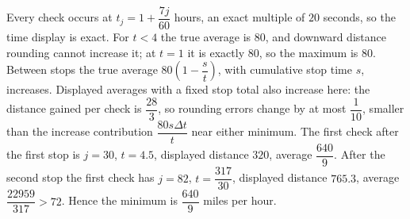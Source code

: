 Every check occurs at $t_j=1+\dfrac{7j}{60}$ hours, an exact multiple of $20$ seconds, so the time display is exact. For $t<4$ the true average is $80$, and downward distance rounding cannot increase it; at $t=1$ it is exactly $80$, so the maximum is $\boxed{80}$. Between stops the true average $80(1-\dfrac{s}{t})$, with cumulative stop time $s$, increases. Displayed averages with a fixed stop total also increase here: the distance gained per check is $\dfrac{28}{3}$, so rounding errors change by at most $\dfrac{1}{10}$, smaller than the increase contribution $\dfrac{80s\Delta t}{t}$ near either minimum. The first check after the first stop is $j=30$, $t=4.5$, displayed distance $320$, average $\dfrac{640}{9}$. After the second stop the first check has $j=82$, $t=\dfrac{317}{30}$, displayed distance $765.3$, average $\dfrac{22959}{317}>72$. Hence the minimum is $\boxed{\dfrac{640}{9}}$ miles per hour.

